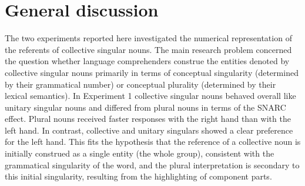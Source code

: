 \documentclass[output=paper]{langscibook}
\begin{document}
\section{General discussion}
The two experiments reported here investigated the numerical representation of the referents of collective singular nouns. The main research problem concerned the question whether language comprehenders construe the entities denoted by collective singular nouns primarily in terms of conceptual singularity (determined by their grammatical number) or conceptual plurality (determined by their lexical semantics). In Experiment 1 collective singular nouns behaved overall like unitary singular nouns and differed from plural nouns in terms of the SNARC effect. Plural nouns received faster responses with the right hand than with the left hand. In contrast, collective and unitary singulars showed a clear preference for the left hand. This fits the hypothesis that the reference of a collective noun is initially construed as a single entity (the whole group), consistent with the grammatical singularity of the word, and the plural interpretation is secondary to this initial singularity, resulting from the highlighting of component parts. 
\end{document}
